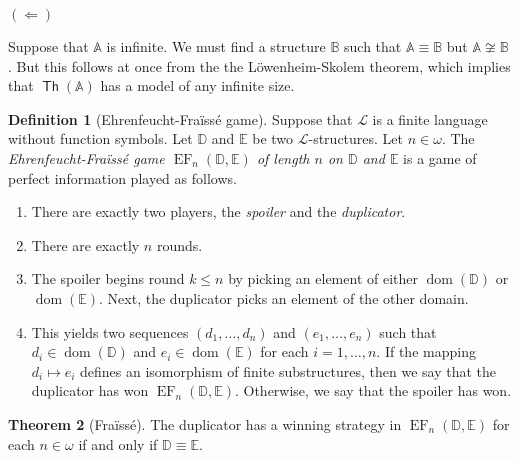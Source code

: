 \documentclass[10pt,letterpaper,cm]{nupset}
\theoremstyle{definition}
\newtheorem{definition}{Definition}
\theoremstyle{theorem}
\newtheorem{theorem}[definition]{Theorem}
\theoremstyle{remark}
\newcommand{\A}{\mathbb A}
\newcommand{\D}{\mathbb D}
\newcommand{\E}{\mathbb E}
\renewcommand{\L}{\mathcal L}
\newcommand{\B}{\mathbb{B}}
\newcommand{\1}{\mathbb{1}}
\renewcommand{\i}{\vec i}
\newcommand{\0}{\vec 0}
\DeclareMathOperator{\dom}{dom}
\DeclareMathOperator{\ef}{EF}
\DeclareMathOperator{\thh}{\mathsf{Th}}
\begin{document}
\begin{solution}
\medskip

$(\Longleftarrow)$

\smallskip

Suppose that $\A$ is infinite. We must find a structure $\B$ such that $\A \equiv \B$ but $\A \not\cong \B$. But this follows at once from the the L\"owenheim-Skolem theorem, which implies that $\thh(\A)$ has a model of any infinite size. 

\end{solution}

\medskip

\begin{definition}[Ehrenfeucht-Fra\"{\i}ss\'e  game]
Suppose that $\L$ is a finite language without function symbols. Let $\D$ and $\E$ be two $\L$-structures. Let $n\in \omega$. The \textit{Ehrenfeucht-Fra\"{\i}ss\'e  game $\ef_n(\D, \E)$ of length $n$ on $\D$ and $\E$} is a game of perfect information played as follows.
\begin{enumerate}[label=(\alph*)]
\item There are exactly two players, the \textit{spoiler} and the \textit{duplicator}.
\item There are exactly $n$ rounds.
\item The spoiler begins round $k\leq n$ by picking an element of either $\dom(\D)$ or $\dom(\E)$. Next, the duplicator picks an element of the other domain.
\item This yields two sequences $\left(d_1, \ldots, d_n\right)$ and $\left(e_1, \ldots, e_n\right)$ such that $d_i\in \dom(\D)$ and $e_i\in \dom(\E)$ for each $i=1, \ldots, n$.  If the mapping $d_i \mapsto e_i$ defines an isomorphism of finite substructures, then we say that the duplicator has won $\ef_n(\D, \E)$. Otherwise, we say that the spoiler has won.
\end{enumerate}
\end{definition}

\begin{theorem}[Fra\"{\i}ss\'e]\label{EF}
The duplicator has a winning strategy in $\ef_n(\D, \E)$ for each $n\in \omega$ if and only if $\D \equiv \E$.
\end{theorem}
\end{document}
